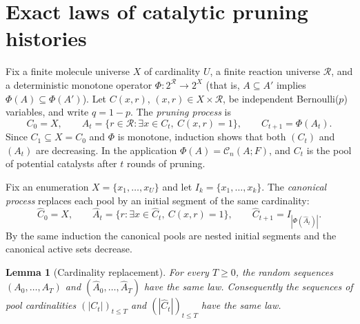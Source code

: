 \documentclass[11pt,reqno]{amsart}
\theoremstyle{plain}
\newtheorem{lemma}[theorem]{Lemma}
\theoremstyle{definition}
\theoremstyle{remark}
\numberwithin{equation}{section}
\newcommand{\cC}{\mathcal{C}}
\newcommand{\cR}{\mathcal{R}}
\begin{document}
\section{Exact laws of catalytic pruning histories}\label{sec:histories}

Fix a finite molecule universe $X$ of cardinality $U$, a finite reaction universe $\cR$, and a deterministic monotone operator $\Phi\colon2^{\cR}\to2^{X}$ (that is, $A\subseteq A'$ implies $\Phi(A)\subseteq\Phi(A')$). Let $C(x,r)$, $(x,r)\in X\times\cR$, be independent Bernoulli($p$) variables, and write $q=1-p$. The \emph{pruning process} is
\begin{equation}\label{eq:pruning}
C_0=X,\qquad A_t=\{r\in\cR:\exists x\in C_t,\ C(x,r)=1\},\qquad C_{t+1}=\Phi(A_t).
\end{equation}
Since $C_1\subseteq X=C_0$ and $\Phi$ is monotone, induction shows that both $(C_t)$ and $(A_t)$ are decreasing. In the application $\Phi(A)=\cC_n(A;F)$, and $C_t$ is the pool of potential catalysts after $t$ rounds of pruning.

Fix an enumeration $X=\{x_1,\dots,x_U\}$ and let $I_k=\{x_1,\dots,x_k\}$. The \emph{canonical process} replaces each pool by an initial segment of the same cardinality:
\begin{equation}\label{eq:canonical}
\widehat C_0=X,\qquad \widehat A_t=\{r:\exists x\in\widehat C_t,\ C(x,r)=1\},\qquad \widehat C_{t+1}=I_{|\Phi(\widehat A_t)|}.
\end{equation}
By the same induction the canonical pools are nested initial segments and the canonical active sets decrease.

\begin{lemma}[Cardinality replacement]\label{lem:cardinality}
For every $T\ge0$, the random sequences $(A_0,\dots,A_T)$ and $(\widehat A_0,\dots,\widehat A_T)$ have the same law. Consequently the sequences of pool cardinalities $(|C_t|)_{t\le T}$ and $(|\widehat C_t|)_{t\le T}$ have the same law.
\end{lemma}
\end{document}
